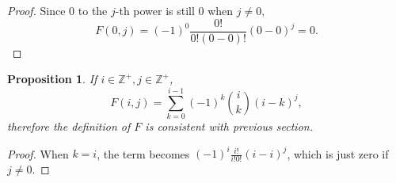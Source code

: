 \documentclass[12pt, letterpaper]{article}
\newcommand{\inte}{\mathbb{Z}}
\newtheorem{prop}{Proposition}[section]
\theoremstyle{definition}
\theoremstyle{remark}
\begin{document}
	\begin{proof}
		Since $0$ to the $j$-th power is still 0 when $j\ne0$,
		\[F(0,j)=(-1)^0\frac{0!}{0!(0-0)!}\left(0-0\right)^j=0.\]
	\end{proof}
	\begin{prop}
		If $i\in\inte^+,j\in\inte^+$,
		\begin{equation}\label{eqFijpos}
			F(i,j)=\sum_{k=0}^{i-1}(-1)^k\binom{i}{k}\left(i-k\right)^j,
		\end{equation}
		therefore the definition of $F$ is consistent with previous section.
	\end{prop}
	\begin{proof}
		When $k=i$, the term becomes $(-1)^i\frac{i!}{i!0!}\left(i-i\right)^j$, which is just zero if $j\ne0$.
	\end{proof}
\end{document}
